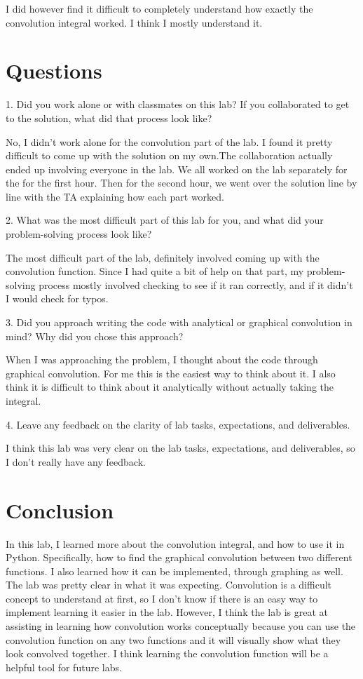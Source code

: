 \documentclass[12pt]{report}
\begin{document}
I did however find it difficult to completely understand how
exactly the convolution integral worked. I think I mostly 
understand it.

\section{Questions}
1. Did you work alone or with classmates on this lab? If you collaborated to get to the solution, what did that process look like?

No, I didn't work alone for the convolution part of the lab. I found it 
pretty difficult to come up with the solution on my own.The collaboration
actually ended up involving everyone in the lab. We all worked on the
lab separately for the for the first hour. Then for the second hour, we
went over the solution line by line with the TA explaining how each part
worked.

2. What was the most difficult part of this lab for you, and what did your
problem-solving process look like?

The most difficult part of the lab, definitely involved coming up with 
the convolution function. Since I had quite a bit of help on that part,
my problem-solving process mostly involved checking to see if it ran
correctly, and if it didn't I would check for typos. 

3. Did you approach writing the code with analytical or graphical 
convolution in mind? Why did you chose this approach?

When I was approaching the problem, I thought about the code through
graphical convolution. For me this is the easiest way to think about it.
I also think it is difficult to think about it analytically without
actually taking the integral.

4. Leave any feedback on the clarity of lab tasks, expectations, and 
deliverables.

I think this lab was very clear on the lab tasks, expectations, and 
deliverables, so I don't really have any feedback.

\section{Conclusion}
In this lab, I learned more about the convolution integral, and how to use
it in Python. Specifically, how to find the graphical convolution between
two different functions. I also learned how it can be implemented, through 
graphing as well. The lab was pretty clear in what it was expecting.
Convolution is a difficult concept to understand at first, so I don't know
if there is an easy way to implement learning it easier in the lab.
However, I think the lab is great at assisting in learning how convolution
works conceptually because you can use the convolution function on 
any two functions and it will visually show what they look convolved
together. I think learning the convolution function will be a helpful tool
for future labs.
\end{document}
